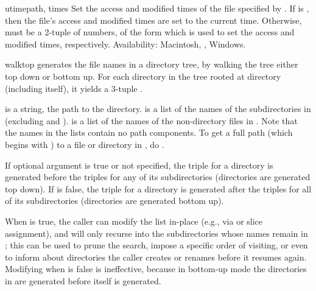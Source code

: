 \begin{funcdesc}{utime}{path, times}
Set the access and modified times of the file specified by .
If  is , then the file's access and modified
times are set to the current time.  Otherwise,  must be a
2-tuple of numbers, of the form 
which is used to set the access and modified times, respectively.
Availability: Macintosh, \UNIX, Windows.
\end{funcdesc}

\begin{funcdesc}{walk}{top}
 generates the file names in a directory tree, by
walking the tree either top down or bottom up.
For each directory in the tree rooted at directory  (including
 itself), it yields a 3-tuple
.

 is a string, the path to the directory.   is
a list of the names of the subdirectories in 
(excluding  and ).   is a list of
the names of the non-directory files in .  Note that the
names in the lists contain no path components.  To get a full
path (which begins with ) to a file or directory in
, do .

If optional argument  is true or not specified, the triple
for a directory is generated before the triples for any of its
subdirectories (directories are generated top down).  If  is
false, the triple for a directory is generated after the triples for all
of its subdirectories (directories are generated bottom up).

When  is true, the caller can modify the  list
in-place (e.g., via  or slice assignment), and
 will only recurse into the subdirectories whose names
remain in ; this can be used to prune the search,
impose a specific order of visiting, or even to inform 
about directories the caller creates or renames before it resumes
 again.  Modifying  when  is
false is ineffective, because in bottom-up mode the directories in
 are generated before  itself is generated.


\end{funcdesc}
